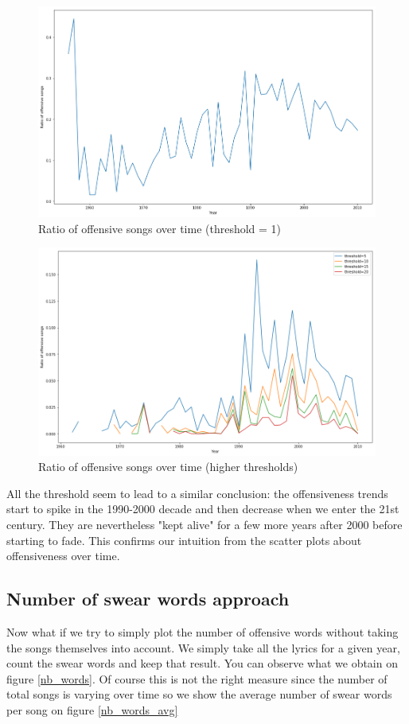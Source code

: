 \documentclass[11pt]{article}
\begin{document}
\begin{figure}
\centering
\includegraphics[width=\textwidth]{plots/ratio_time}
\caption{Ratio of offensive songs over time (threshold = 1)}
\label{ratio_time}
\end{figure}

\begin{figure}
\centering
\includegraphics[width=\textwidth]{plots/ratio_time_threshold}
\caption{Ratio of offensive songs over time (higher thresholds)}
\label{ratio_time_threshold}
\end{figure}

All the threshold seem to lead to a similar conclusion: the offensiveness trends start to spike in the 1990-2000 decade and then decrease when we enter the 21st century. They are nevertheless "kept alive" for a few more years after 2000 before starting to fade. This confirms our intuition from the scatter plots about offensiveness over time.

\subsection{Number of swear words approach}
Now what if we try to simply plot the number of offensive words without taking the songs themselves into account. We simply take all the lyrics for a given year, count the swear words and keep that result. You can observe what we obtain on figure \ref{nb_words}. Of course this is not the right measure since the number of total songs is varying over time so we show the average number of swear words per song on figure \ref{nb_words_avg}
\end{document}
